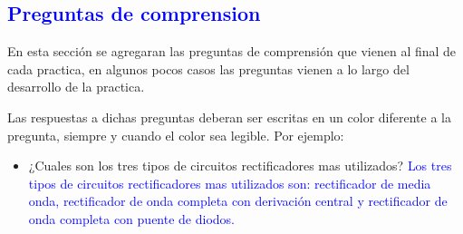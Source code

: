 \textcolor{blue}{\section{Preguntas de comprension}}


En esta sección se agregaran las preguntas de comprensión que vienen al final de cada practica, en algunos pocos casos las preguntas vienen a lo largo del desarrollo de la practica.

Las respuestas a dichas preguntas deberan ser escritas en un color diferente a la pregunta, siempre y cuando el color sea legible. Por ejemplo:

\begin{itemize}
    \item ¿Cuales son los tres tipos de circuitos rectificadores mas utilizados?
    \textcolor{blue}{Los tres tipos de circuitos rectificadores mas utilizados son: rectificador de media onda, rectificador de onda completa con derivación central y rectificador de onda completa con puente de diodos.}
\end{itemize}